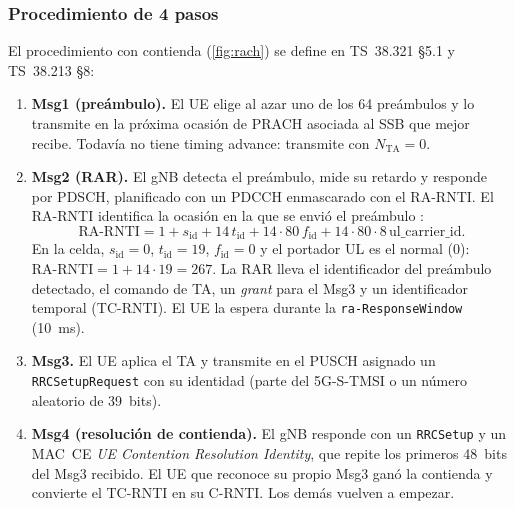 \subsubsection{Procedimiento de 4 pasos}
El procedimiento con contienda (\cref{fig:rach}) se define en TS~38.321 §5.1 y TS~38.213 §8:
\begin{enumerate}
  \item \textbf{Msg1 (preámbulo).} El UE elige al azar uno de los 64 preámbulos y lo transmite en la próxima ocasión de PRACH asociada al SSB que mejor recibe. Todavía no tiene timing advance: transmite con $N_\text{TA}=0$.
  \item \textbf{Msg2 (RAR).} El gNB detecta el preámbulo, mide su retardo y responde por PDSCH, planificado con un PDCCH enmascarado con el RA-RNTI. El RA-RNTI identifica la ocasión en la que se envió el preámbulo \cite[§5.1.3]{ts38321}:
  \begin{equation}
  \text{RA-RNTI} = 1 + s_\text{id} + 14\,t_\text{id} + 14\cdot 80\,f_\text{id} + 14\cdot 80\cdot 8\,\text{ul\_carrier\_id}.
  \end{equation}
  En la celda, $s_\text{id}=0$, $t_\text{id}=19$, $f_\text{id}=0$ y el portador UL es el normal (0): $\text{RA-RNTI} = 1 + 14\cdot 19 = 267$. La RAR lleva el identificador del preámbulo detectado, el comando de TA, un \emph{grant} para el Msg3 y un identificador temporal (TC-RNTI). El UE la espera durante la \texttt{ra-ResponseWindow} (10~ms).
  \item \textbf{Msg3.} El UE aplica el TA y transmite en el PUSCH asignado un \texttt{RRCSetupRequest} con su identidad (parte del 5G-S-TMSI o un número aleatorio de 39~bits).
  \item \textbf{Msg4 (resolución de contienda).} El gNB responde con un \texttt{RRCSetup} y un MAC~CE \emph{UE Contention Resolution Identity}, que repite los primeros 48~bits del Msg3 recibido. El UE que reconoce su propio Msg3 ganó la contienda y convierte el TC-RNTI en su C-RNTI. Los demás vuelven a empezar.
\end{enumerate}

